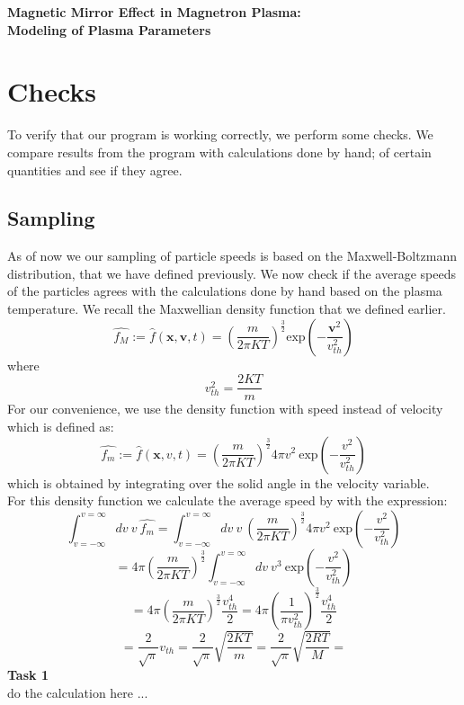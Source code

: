 \documentclass[12pt]{article}
\begin{document}
	\selectfont 
	\begin{center}
		\Large{\textbf{Magnetic Mirror Effect in Magnetron Plasma:}} \\
		\Large{\textbf{Modeling of Plasma Parameters}} \\
	\end{center}
	
	\section{Checks}
	To verify that our program is working correctly, we perform some checks. We compare results from the program with calculations done by hand; of certain quantities and see if they agree.
	
	\subsection{Sampling}
	As of now we our sampling of particle speeds is based on the Maxwell-Boltzmann distribution, that we have defined previously. We now check if the average speeds of the particles agrees with the calculations done by hand based on the plasma temperature.
	We recall the Maxwellian density function that we defined earlier. 
	\begin{equation}
		\label{eqn:maxwellian}
		\widehat{f_{M}} := \hat{f}(\boldsymbol{x}, \boldsymbol{v}, t) = \left(\frac{m}{2\pi KT}\right)^{\frac{3}{2}} \mathrm{exp}\left(-\frac{\boldsymbol{v}^{2}}{v_{th}^{2}}\right)
	\end{equation} where $$v_{th}^{2} = \frac{2 K T}{m}$$
	For our convenience, we use the density function with speed instead of velocity which is defined as:
	\begin{equation}
		\label{eqn:maxwellianSpeed}
		\widehat{f_{m}} := \hat{f}(\boldsymbol{x}, v, t) = \left(\frac{m}{2\pi KT}\right)^{\frac{3}{2}} 4 \pi v^{2} \: \mathrm{exp}\left(-\frac{v^{2}}{v_{th}^{2}}\right)
	\end{equation} which is obtained by integrating over the solid angle in the velocity variable. \\

	For this density function we calculate the average speed by with the expression:
	$$ \int_{v = - \infty}^{v = \infty} d v \: v \: \widehat{f_{m}} = \int_{v = - \infty}^{v = \infty} d v \: v \: \left(\frac{m}{2\pi KT}\right)^{\frac{3}{2}} 4 \pi v^{2} \: \mathrm{exp}\left(-\frac{v^{2}}{v_{th}^{2}}\right)$$
	$$=  4 \pi \left(\frac{m}{2\pi KT}\right)^{\frac{3}{2}} \int_{v = - \infty}^{v = \infty} d v \: v^{3} \: \mathrm{exp}\left(-\frac{v^{2}}{v_{th}^{2}}\right)$$ $$ = 4 \pi \left(\frac{m}{2\pi KT}\right)^{\frac{3}{2}} \frac{v_{th}^{4}}{2} = 4 \pi \left(\frac{1}{\pi v_{th}^{2}}\right)^{\frac{3}{2}} \frac{v_{th}^{4}}{2}$$ $$= \frac{2}{\sqrt{\pi}} v_{th} = \frac{2}{\sqrt{\pi}} \sqrt{\frac{2 K T}{m}} = \frac{2}{\sqrt{\pi}} \sqrt{\frac{2 R T}{M}} = $$ 
	\color{red}    \textbf{Task 1} \\
	do the calculation here ... \color{black}
	
\end{document}
